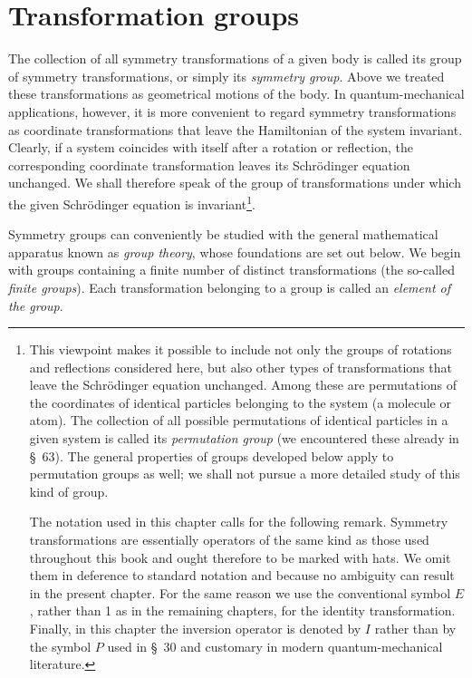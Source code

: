 \section{Transformation groups}

The collection of all symmetry transformations of a given body is called its group of symmetry transformations, or simply its \emph{symmetry group}. Above we treated these transformations as geometrical motions of the body. In quantum-mechanical applications, however, it is more convenient to regard symmetry transformations as coordinate transformations that leave the Hamiltonian of the system invariant. Clearly, if a system coincides with itself after a rotation or reflection, the corresponding coordinate transformation leaves its Schrödinger equation unchanged. We shall therefore speak of the group of transformations under which the given Schrödinger equation is invariant\footnote{This viewpoint makes it possible to include not only the groups of rotations and reflections considered here, but also other types of transformations that leave the Schrödinger equation unchanged. Among these are permutations of the coordinates of identical particles belonging to the system (a molecule or atom). The collection of all possible permutations of identical particles in a given system is called its \emph{permutation group} (we encountered these already in \S~63). The general properties of groups developed below apply to permutation groups as well; we shall not pursue a more detailed study of this kind of group.

The notation used in this chapter calls for the following remark. Symmetry transformations are essentially operators of the same kind as those used throughout this book and ought therefore to be marked with hats. We omit them in deference to standard notation and because no ambiguity can result in the present chapter. For the same reason we use the conventional symbol $E$, rather than 1 as in the remaining chapters, for the identity transformation. Finally, in this chapter the inversion operator is denoted by $I$ rather than by the symbol $P$ used in \S~30 and customary in modern quantum-mechanical literature.}.

Symmetry groups can conveniently be studied with the general mathematical apparatus known as \emph{group theory}, whose foundations are set out below. We begin with groups containing a finite number of distinct transformations (the so-called \emph{finite groups}). Each transformation belonging to a group is called an \emph{element of the group}.

